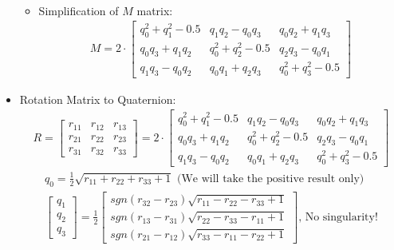 \documentclass{article}
\begin{document}
\begin{itemize}
\begin{itemize}
\begin{gather*}
        \end{gather*}
        \item Simplification of $M$ matrix:
        \begin{gather*}
            M = 2\cdot
            \begin{bmatrix}
            q^2_0 + q^2_1 -0.5 & q_1q_2-q_0q_3 & q_0q_2+q_1q_3  \\
            q_0q_3 + q_1q_2 & q^2_0 + q^2_2 - 0.5 & q_2q_3-q_0q_1 \\
            q_1q_3-q_0q_2 & q_0q_1+q_2q_3 & q^2_0 + q^2_3 - 0.5
            \end{bmatrix}
        \end{gather*}
    \end{itemize}
    \item Rotation Matrix to Quaternion:
    \begin{gather*}
            R =
        \begin{bmatrix}
            r_{11} & r_{12} & r_{13} \\
            r_{21} & r_{22} & r_{23} \\
            r_{31} & r_{32} & r_{33}
        \end{bmatrix} = 2\cdot
        \begin{bmatrix}
            q^2_0 + q^2_1 -0.5 & q_1q_2-q_0q_3 & q_0q_2+q_1q_3  \\
            q_0q_3 + q_1q_2 & q^2_0 + q^2_2 - 0.5 & q_2q_3-q_0q_1 \\
            q_1q_3-q_0q_2 & q_0q_1+q_2q_3 & q^2_0 + q^2_3 - 0.5
        \end{bmatrix}
    \end{gather*}
    \begin{gather*}
        q_0 = \frac{1}{2}\sqrt{r_{11}+r_{22}+r_{33}+1} \textrm{ (We will take the positive result only)}\\
        \begin{bmatrix}
        q_1\\
        q_2\\
        q_3
        \end{bmatrix}
        =\frac{1}{2}
        \begin{bmatrix}
        sgn(r_{32}-r_{23})\sqrt{r_{11}-r_{22}-r_{33} + 1}\\
        sgn(r_{13}-r_{31})\sqrt{r_{22}-r_{33}-r_{11} + 1}\\
        sgn(r_{21}-r_{12})\sqrt{r_{33}-r_{11}-r_{22} + 1}
        \end{bmatrix}
        \textrm{, No singularity!}

\end{gather*}
\end{itemize}
\end{document}
